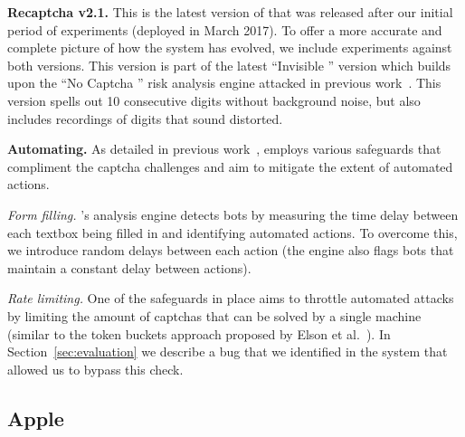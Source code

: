 \textbf{Recaptcha v2.1.} This is the latest version of \re that was released after our initial period of experiments (deployed in March 2017).
To offer a more accurate and complete picture of how the system has evolved, we include experiments against both versions.
This version is part of the latest ``Invisible \re'' version which builds upon the ``No Captcha \re'' risk analysis engine attacked in 
previous work~\cite{sivakorn:eurosp16}. This version spells out 10 consecutive digits without background noise, but also includes
recordings of digits that sound distorted.


\textbf{Automating.} As detailed in previous work~\cite{sivakorn:eurosp16}, \re employs various
safeguards that compliment the captcha challenges and aim to mitigate the extent of automated 
actions.

\emph{Form filling.} \re's analysis engine detects bots by measuring the time delay between
each textbox being filled in and identifying automated actions. To overcome this, we introduce 
random delays between each action (the engine also flags bots that maintain a constant delay 
between actions).

\emph{Rate limiting.} One of the safeguards in place aims to throttle automated attacks by limiting 
the amount of captchas that can be solved by a single machine (similar to the token buckets approach proposed by
Elson et al.~\cite{asirra}). In Section~\ref{sec:evaluation} we describe a bug that we identified in the system
that allowed us to bypass this check.

\subsection{Apple}


